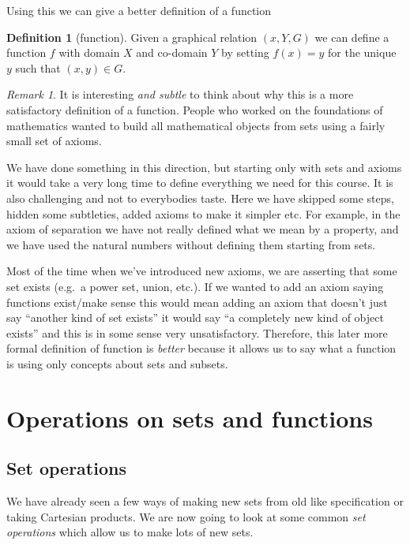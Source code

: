 \documentclass[
]{book}
\theoremstyle{definition}
\newtheorem{definition}{Definition}[chapter]
\theoremstyle{definition}
\theoremstyle{definition}
\theoremstyle{definition}
\theoremstyle{remark}
\newtheorem*{remark}{Remark}
\begin{document}
Using this we can give a better definition of a function

\begin{definition}[function]
Given a graphical relation \((x,Y,G)\) we can define a function \(f\) with domain \(X\) and co-domain \(Y\) by setting \(f(x) = y\) for the unique \(y\) such that \((x,y) \in G\).
\end{definition}

\begin{remark}
It is interesting \emph{and subtle} to think about why this is a more satisfactory definition of a function. People who worked on the foundations of mathematics wanted to build all mathematical objects from sets using a fairly small set of axioms.

We have done something in this direction, but starting only with sets and axioms it would take a very long time to define everything we need for this course. It is also challenging and not to everybodies taste. Here we have skipped some steps, hidden some subtleties, added axioms to make it simpler etc. For example, in the axiom of separation we have not really defined what we mean by a property, and we have used the natural numbers without defining them starting from sets.

Most of the time when we've introduced new axioms, we are asserting that some set exists (e.g.~a power set, union, etc.). If we wanted to add an axiom saying functions exist/make sense this would mean adding an axiom that doesn't just say ``another kind of set exists'' it would say ``a completely new kind of object exists'' and this is in some sense very unsatisfactory. Therefore, this later more formal definition of function is \emph{better} because it allows us to say what a function is using only concepts about sets and subsets.
\end{remark}

\chapter{Operations on sets and functions}\label{operations-on-sets-and-functions}

\section{Set operations}\label{set-operations}

We have already seen a few ways of making new sets from old like specification or taking Cartesian products. We are now going to look at some common \emph{set operations} which allow us to make lots of new sets.
\end{document}
